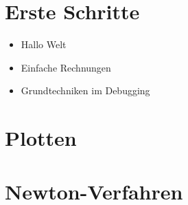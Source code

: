 \documentclass{blatt}
\begin{document}
\section{Erste Schritte}

\begin{itemize}
\item Hallo Welt
\item Einfache Rechnungen
\item Grundtechniken im Debugging
\end{itemize}


\section{Plotten}


\section{Newton-Verfahren}
\end{document}
